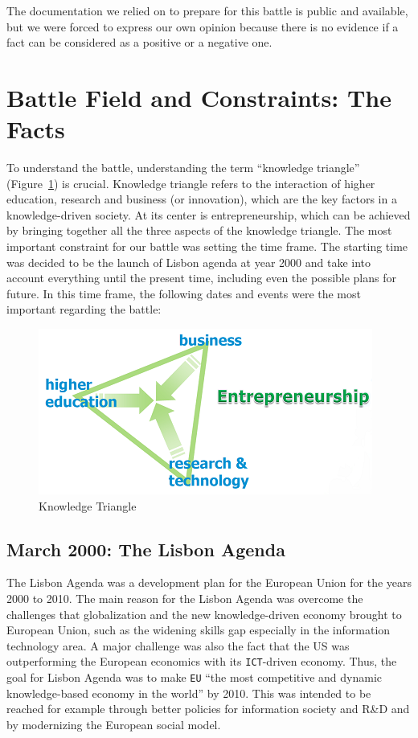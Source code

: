 \documentclass[11pt,a4paper,oneside,twocolumn]{IEEEtran}
\begin{document}
The documentation we relied on to prepare for this battle is public and available, but we were forced to express our own opinion because there is no evidence if a fact can be considered as a positive or a negative one.

\section{Battle Field and Constraints: The Facts}
To understand the battle, understanding the term ``knowledge triangle'' (Figure~\ref{fig:kt}) is crucial. Knowledge triangle refers to the interaction of higher education, research and business (or innovation), which are the key factors in a knowledge-driven society. At its center is entrepreneurship, which can be achieved by bringing together all the three aspects of the knowledge triangle.
The most important constraint for our battle was setting the time frame. The starting time was decided to be the launch of Lisbon agenda at year 2000 and take into account everything until the present time, including even the possible plans for future. In this time frame, the following dates and events were the most important regarding the battle:

\begin{figure}[!h]
    \centering
    \includegraphics[width=0.8\linewidth]{picture/Knowledge_Triangle.png}
    \caption{Knowledge Triangle}\label{fig:kt}
\end{figure}

\subsection{March 2000: The Lisbon Agenda}
The Lisbon Agenda was a development plan for the European Union for the years 2000 to 2010. The main reason for the Lisbon Agenda was overcome the challenges that globalization and the new knowledge-driven economy brought to European Union, such as the widening skills gap especially in the information technology area\cite{3_1}. A major challenge was also the fact that the US was outperforming the European economics with its \texttt{ICT}-driven economy\cite{3_1}. Thus, the goal for Lisbon Agenda was to make \texttt{EU} ``the most competitive and dynamic knowledge-based economy in the world'' by 2010\cite{3_1}. This was intended to be reached for example through better policies for information society and R\&D and by modernizing the European social model\cite{3_1}.
\end{document}
